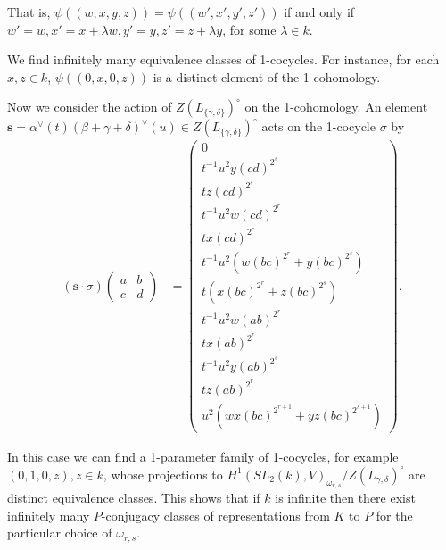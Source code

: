 That is, $\psi((w,x,y,z)) = \psi((w',x', y', z'))$ if and only if $w'=w, x'=x+\lambda w, y'=y, z'=z+\lambda y$, for some $\lambda\in k$.

We find infinitely many equivalence classes of 1-cocycles. For instance, for each $x, z\in k$, $\psi((0,x,0,z))$ is a distinct element of the 1-cohomology.

Now we consider the action of $Z(L_{\{\gamma,\delta\}})^\circ$ on the 1-cohomology. An element $\mathbf{s} = \alpha^\vee(t)(\beta + \gamma + \delta)^\vee(u)\in Z(L_{\{\gamma,\delta\}})^\circ$ acts on the 1-cocycle $\sigma$ by
\begin{align*}
(\mathbf{s}\cdot\sigma)\left(\begin{matrix} a & b \\ c & d\end{matrix}\right)
&=
\left(\begin{matrix}
0 \\
t^{-1}u^{2}y(cd)^{2^s} \\
tz(cd)^{2^s} \\
t^{-1}u^{2}w(cd)^{2^r} \\
tx(cd)^{2^r} \\
t^{-1}u^{2}(w(bc)^{2^r} + y(bc)^{2^s}) \\
t(x(bc)^{2^r} + z(bc)^{2^s}) \\
t^{-1}u^{2}w(ab)^{2^r} \\
tx(ab)^{2^r}  \\
t^{-1}u^{2}y(ab)^{2^s} \\
tz(ab)^{2^r} \\
u^2(wx(bc)^{2^{r+1}} + yz(bc)^{2^{s+1}})
\end{matrix}\right).
\end{align*}

In this case we can find a 1-parameter family of 1-cocycles, for example $(0, 1, 0, z), z\in k$, whose projections to $H^1(SL_2(k), V)_{\omega_{r,s}}/Z(L_{\gamma, \delta})^\circ$ are distinct equivalence classes. This shows that if $k$ is infinite then there exist infinitely many $P$-conjugacy classes of representations from $K$ to $P$ for the particular choice of $\omega_{r,s}$.
